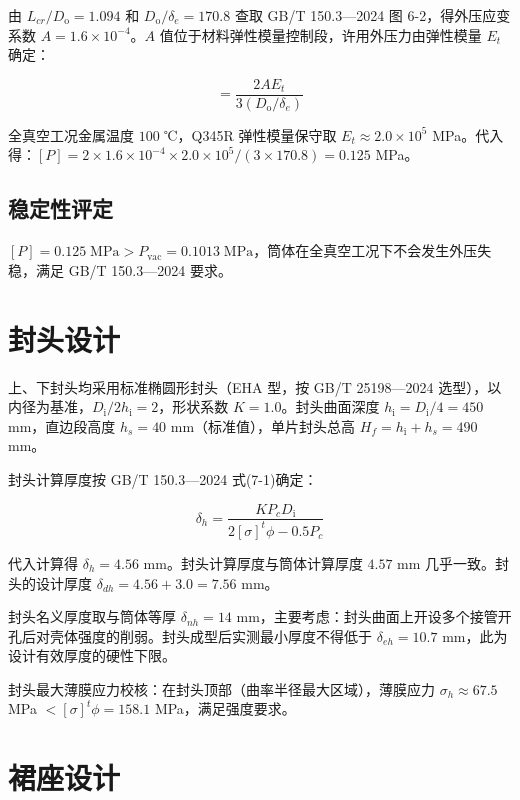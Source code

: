 由 $L_{cr}/D_{\mathrm{o}} = 1.094$ 和 $D_{\mathrm{o}}/\delta_e = 170.8$ 查取 GB/T 150.3—2024 图 6-2，得外压应变系数 $A = 1.6 \times 10^{-4}$。$A$ 值位于材料弹性模量控制段，许用外压力由弹性模量 $E_t$ 确定：

\begin{equation}
[P] = \frac{2AE_t}{3(D_{\mathrm{o}}/\delta_e)}
\label{eq:allow-p-2}
\end{equation}

全真空工况金属温度 $100$ ℃，Q345R 弹性模量保守取 $E_t \approx 2.0 \times 10^5$ MPa。代入得：$[P] = 2 \times 1.6 \times 10^{-4} \times 2.0 \times 10^5 / (3 \times 170.8) = 0.125$ MPa。

\subsection{稳定性评定}

$[P] = 0.125 \; \mathrm{MPa} > P_{\mathrm{vac}} = 0.1013 \; \mathrm{MPa}$，筒体在全真空工况下不会发生外压失稳，满足 GB/T 150.3—2024 要求。

\section{封头设计}

上、下封头均采用标准椭圆形封头（EHA 型，按 GB/T 25198—2024 选型\cite{gbt25198-2024}），以内径为基准，$D_{\mathrm{i}}/2h_{\mathrm{i}} = 2$，形状系数 $K = 1.0$。封头曲面深度 $h_{\mathrm{i}} = D_{\mathrm{i}}/4 = 450$ mm，直边段高度 $h_s = 40$ mm（标准值），单片封头总高 $H_f = h_{\mathrm{i}} + h_s = 490$ mm。

封头计算厚度按 GB/T 150.3—2024 式(7-1)确定：

\begin{equation}
\delta_h = \frac{K P_c D_{\mathrm{i}}}{2[\sigma]^t \phi - 0.5P_c}
\label{eq:head-delta-2}
\end{equation}

代入计算得 $\delta_h = 4.56$ mm。封头计算厚度与筒体计算厚度 $4.57$ mm 几乎一致。封头的设计厚度 $\delta_{dh} = 4.56 + 3.0 = 7.56$ mm。

封头名义厚度取与筒体等厚 $\delta_{nh} = 14$ mm，主要考虑：封头曲面上开设多个接管开孔后对壳体强度的削弱。封头成型后实测最小厚度不得低于 $\delta_{eh} = 10.7$ mm，此为设计有效厚度的硬性下限。

封头最大薄膜应力校核：在封头顶部（曲率半径最大区域），薄膜应力 $\sigma_h \approx 67.5$ MPa $ < [\sigma]^t\phi = 158.1$ MPa，满足强度要求。

\section{裙座设计}

